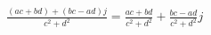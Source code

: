 $\displaystyle \frac{(ac+bd) + (bc-ad)j}{c^2 + d^2} = \frac{ac+bd}{c^2+d^2} + \frac{bc-ad}{c^2+d^2}j$
